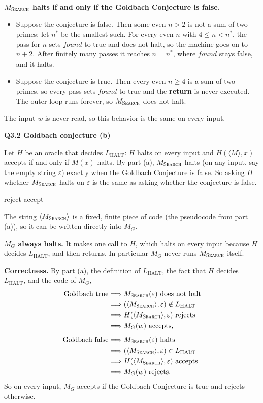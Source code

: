 \documentclass[11pt]{article}
\newcommand{\inner}[1]{\langle #1 \rangle}
\newcommand{\Lh}{L_{\text{HALT}}}
\newcommand{\Ms}{M_{\textsc{Search}}}
\newcommand{\qpage}[1]{\clearpage\noindent\textbf{\large #1}\par\medskip}
\begin{document}
\textbf{$\Ms$ halts if and only if the Goldbach Conjecture is false.}
\begin{itemize}
  \item Suppose the conjecture is false.
  Then some even $n > 2$ is not a sum of two primes; let $n^*$ be the smallest such.
  For every even $n$ with $4 \le n < n^*$, the pass for $n$ sets $\mathit{found}$ to true and does not halt, so the machine goes on to $n+2$.
  After finitely many passes it reaches $n = n^*$, where $\mathit{found}$ stays false, and it halts.
  \item Suppose the conjecture is true.
  Then every even $n \ge 4$ is a sum of two primes, so every pass sets $\mathit{found}$ to true and the \textbf{return} is never executed.
  The outer loop runs forever, so $\Ms$ does not halt.
\end{itemize}
The input $w$ is never read, so this behavior is the same on every input.

\qpage{Q3.2 Goldbach conjecture (b)}

Let $H$ be an oracle that decides $\Lh$: $H$ halts on every input and $H(\inner{M}, x)$ accepts if and only if $M(x)$ halts.
By part (a), $\Ms$ halts (on any input, say the empty string $\varepsilon$) exactly when the Goldbach Conjecture is false.
So asking $H$ whether $\Ms$ halts on $\varepsilon$ is the same as asking whether the conjecture is false.

\begin{algorithmic}[1]
    \If{$H(\inner{\Ms}, \varepsilon)$ accepts} \Return reject
    \Else{} \Return accept
    \EndIf
  \EndFunction
\end{algorithmic}

The string $\inner{\Ms}$ is a fixed, finite piece of code (the pseudocode from part (a)), so it can be written directly into $M_G$.

\textbf{$M_G$ always halts.}
It makes one call to $H$, which halts on every input because $H$ decides $\Lh$, and then returns.
In particular $M_G$ never runs $\Ms$ itself.

\textbf{Correctness.}
By part (a), the definition of $\Lh$, the fact that $H$ decides $\Lh$, and the code of $M_G$,
\begin{align*}
  \text{Goldbach true} &\Longrightarrow \Ms(\varepsilon) \text{ does not halt} \\
  &\Longrightarrow (\inner{\Ms}, \varepsilon) \notin \Lh \\
  &\Longrightarrow H(\inner{\Ms}, \varepsilon) \text{ rejects} \\
  &\Longrightarrow M_G(w) \text{ accepts}, \\[0.5em]
  \text{Goldbach false} &\Longrightarrow \Ms(\varepsilon) \text{ halts} \\
  &\Longrightarrow (\inner{\Ms}, \varepsilon) \in \Lh \\
  &\Longrightarrow H(\inner{\Ms}, \varepsilon) \text{ accepts} \\
  &\Longrightarrow M_G(w) \text{ rejects}.
\end{align*}
So on every input, $M_G$ accepts if the Goldbach Conjecture is true and rejects otherwise.
\end{document}
